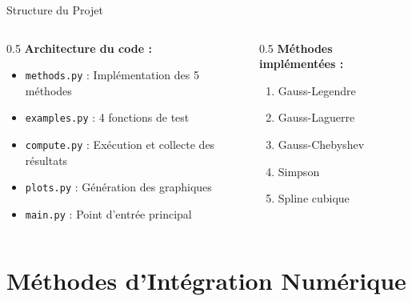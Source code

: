 \documentclass[aspectratio=169,11pt]{beamer}
\begin{document}
\begin{frame}{Structure du Projet}
\begin{columns}
\begin{column}{0.5\textwidth}
\textbf{Architecture du code :}
\begin{itemize}
\item \texttt{methods.py} : Implémentation des 5 méthodes
\item \texttt{examples.py} : 4 fonctions de test
\item \texttt{compute.py} : Exécution et collecte des résultats
\item \texttt{plots.py} : Génération des graphiques
\item \texttt{main.py} : Point d'entrée principal
\end{itemize}
\end{column}

\begin{column}{0.5\textwidth}
\textbf{Méthodes implémentées :}
\begin{enumerate}
\item Gauss-Legendre
\item Gauss-Laguerre
\item Gauss-Chebyshev
\item Simpson
\item Spline cubique
\end{enumerate}
\end{column}
\end{columns}
\end{frame}

\section{Méthodes d'Intégration Numérique}
\end{document}
